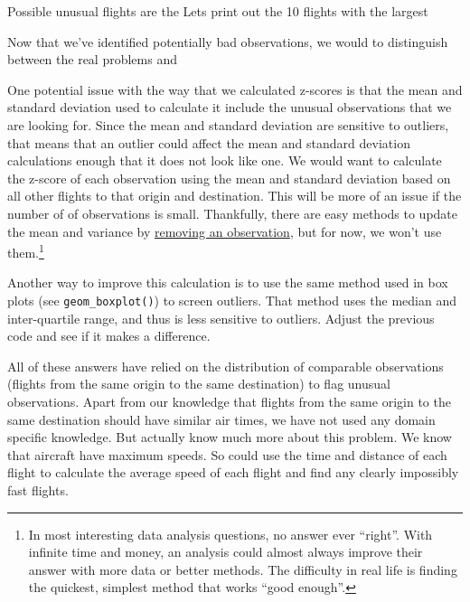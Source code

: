 \documentclass[]{book}
\newenvironment{Shaded}{\begin{snugshade}}{\end{snugshade}}
\newcommand{\CommentTok}[1]{\textcolor[rgb]{0.56,0.35,0.01}{\textit{#1}}}
\newcommand{\DataTypeTok}[1]{\textcolor[rgb]{0.13,0.29,0.53}{#1}}
\newcommand{\DecValTok}[1]{\textcolor[rgb]{0.00,0.00,0.81}{#1}}
\newcommand{\KeywordTok}[1]{\textcolor[rgb]{0.13,0.29,0.53}{\textbf{#1}}}
\newcommand{\NormalTok}[1]{#1}
\newcommand{\OperatorTok}[1]{\textcolor[rgb]{0.81,0.36,0.00}{\textbf{#1}}}
\newcommand{\StringTok}[1]{\textcolor[rgb]{0.31,0.60,0.02}{#1}}
\let\rmarkdownfootnote\footnote%
\def\footnote{\protect\rmarkdownfootnote}
\theoremstyle{plain}
\theoremstyle{remark}
\theoremstyle{definition}
\theoremstyle{definition}
\theoremstyle{definition}
\theoremstyle{remark}
\begin{document}
Possible unusual flights are the Lets print out the 10 flights with the
largest

\begin{Shaded}
\end{Shaded}

Now that we've identified potentially bad observations, we would to
distinguish between the real problems and

One potential issue with the way that we calculated z-scores is that the
mean and standard deviation used to calculate it include the unusual
observations that we are looking for. Since the mean and standard
deviation are sensitive to outliers, that means that an outlier could
affect the mean and standard deviation calculations enough that it does
not look like one. We would want to calculate the z-score of each
observation using the mean and standard deviation based on all other
flights to that origin and destination. This will be more of an issue if
the number of of observations is small. Thankfully, there are easy
methods to update the mean and variance by
\href{https://en.wikipedia.org/wiki/Algorithms_for_calculating_variance}{removing
an observation}, but for now, we won't use them.\footnote{In most
  interesting data analysis questions, no answer ever ``right''. With
  infinite time and money, an analysis could almost always improve their
  answer with more data or better methods. The difficulty in real life
  is finding the quickest, simplest method that works ``good enough''.}

Another way to improve this calculation is to use the same method used
in box plots (see \texttt{geom\_boxplot()}) to screen outliers. That
method uses the median and inter-quartile range, and thus is less
sensitive to outliers. Adjust the previous code and see if it makes a
difference.

All of these answers have relied on the distribution of comparable
observations (flights from the same origin to the same destination) to
flag unusual observations. Apart from our knowledge that flights from
the same origin to the same destination should have similar air times,
we have not used any domain specific knowledge. But actually know much
more about this problem. We know that aircraft have maximum speeds. So
could use the time and distance of each flight to calculate the average
speed of each flight and find any clearly impossibly fast flights.
\end{document}
